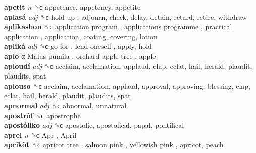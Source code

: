 \textbf{apetit} \emph{n}  ␝ϲ  appetence, appetency, appetite  \\
\textbf{aplasá} \emph{adj}  ␝ϲ   hold up , adjourn, check, delay, detain, retard, retire, withdraw  \\
\textbf{aplikashon} ␝ϲ   application program ,  applications programme ,  practical application , application, coating, covering, lotion  \\
\textbf{apliká} \emph{adj}  ␝ϲ   go for ,  lend oneself , apply, hold  \\
\textbf{aplo} α   Malus pumila ,  orchard apple tree , apple  \\
\textbf{aploudí} \emph{adj}  ␝ϲ  acclaim, acclamation, applaud, clap, eclat, hail, herald, plaudit, plaudits, spat  \\
\textbf{aplouso} ␝ϲ  acclaim, acclamation, applaud, approval, approving, blessing, clap, eclat, hail, herald, plaudit, plaudits, spat  \\
\textbf{apnormal} \emph{adj}  ␝ϲ  abnormal, unnatural  \\
\textbf{apostròf} ␝ϲ  apostrophe  \\
\textbf{apostóliko} \emph{adj}  ␝ϲ  apostolic, apostolical, papal, pontifical  \\
\textbf{aprel} \emph{n}  ␝ϲ   Apr ,  April   \\
\textbf{aprikòt} ␝ϲ   apricot tree ,  salmon pink ,  yellowish pink , apricot, peach  \\
